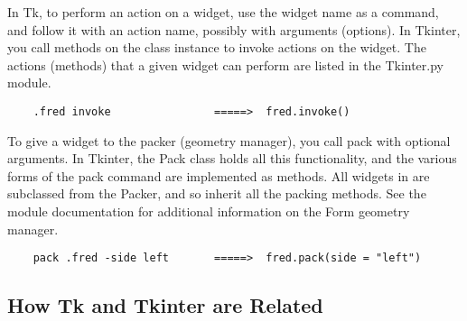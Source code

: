 In Tk, to perform an action on a widget, use the widget name as a
command, and follow it with an action name, possibly with arguments
(options).  In Tkinter, you call methods on the class instance to
invoke actions on the widget.  The actions (methods) that a given
widget can perform are listed in the Tkinter.py module.

\begin{verbatim}
    .fred invoke                =====>  fred.invoke()
\end{verbatim}

To give a widget to the packer (geometry manager), you call pack with
optional arguments.  In Tkinter, the Pack class holds all this
functionality, and the various forms of the pack command are
implemented as methods.  All widgets in  are
subclassed from the Packer, and so inherit all the packing
methods. See the  module documentation for additional
information on the Form geometry manager.

\begin{verbatim}
    pack .fred -side left       =====>  fred.pack(side = "left")
\end{verbatim}


\subsection{How Tk and Tkinter are Related} %


